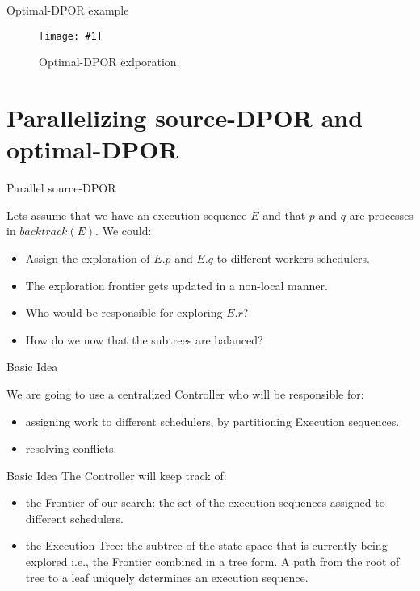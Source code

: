\documentclass[9pt]{beamer}
\newcommand{\tracelong}[2]{
\begin{figure}[H]
\centering
\texttt{[image: \#1]}
\caption{#2}
\label{#2}
\end{figure}
}
\begin{document}
\begin{frame} {Optimal-DPOR example}
\tracelong{../img/opt_seq/55.png}{Optimal-DPOR exlporation.}
\end{frame}

\section{Parallelizing source-DPOR and optimal-DPOR}

\begin{frame} {Parallel source-DPOR}

Lets assume that we have an execution sequence $E$ and that $p$ and $q$ are processes in $backtrack(E)$. We could:

\begin{itemize}[<+->]
  \item Assign the exploration of $E.p$ and $E.q$ to different workers-schedulers.
  \item The exploration frontier gets updated in a non-local manner.
  \item Who would be responsible for exploring $E.r$?
  \item How do we now that the subtrees are balanced?
\end{itemize}
 
\end{frame}

\begin{frame} {Basic Idea}

We are going to use a centralized Controller who will be responsible for:

\begin{itemize}[<+->]
  \item assigning work to different schedulers, by partitioning Execution sequences.
  \item resolving conflicts.
\end{itemize}
\end{frame}

\begin{frame} {Basic Idea}
The Controller will keep track of:

\begin{itemize}[<+->]
  \item the Frontier of our search: the set of the execution sequences assigned to different schedulers.
  \item the Execution Tree: the subtree of the state space that is currently being explored i.e., the Frontier combined in a tree form.
  A path from the root of tree to a leaf uniquely determines an execution sequence.
\end{itemize}

\end{frame}
\end{document}
